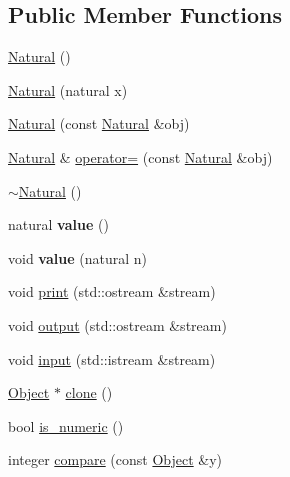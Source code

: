 \subsection*{Public Member Functions}
\begin{DoxyCompactItemize}
\item 
\hyperlink{classez_1_1objects_1_1Natural_a58ad55c4f02c9889291cafe5c5b26ec0}{Natural} ()
\item 
\hyperlink{classez_1_1objects_1_1Natural_a851dc0dec8710296e68c29f886b26bd9}{Natural} (natural x)
\item 
\hyperlink{classez_1_1objects_1_1Natural_a7f8e9004d3de3fac88d0341bc299a399}{Natural} (const \hyperlink{classez_1_1objects_1_1Natural}{Natural} \&obj)
\item 
\hyperlink{classez_1_1objects_1_1Natural}{Natural} \& \hyperlink{classez_1_1objects_1_1Natural_a271019dcdff99e4826b564759f16d3f2}{operator=} (const \hyperlink{classez_1_1objects_1_1Natural}{Natural} \&obj)
\item 
\hyperlink{classez_1_1objects_1_1Natural_a9ba22e1c5f4d7bdc13d426e03301c145}{$\sim$\+Natural} ()
\item 
\mbox{\label{classez_1_1objects_1_1Natural_a6c066338a20e2b519ad47c95cdbbd562}} 
natural {\bfseries value} ()
\item 
\mbox{\label{classez_1_1objects_1_1Natural_a4125a51d902d78e4c9e3f6f569435632}} 
void {\bfseries value} (natural n)
\item 
void \hyperlink{classez_1_1objects_1_1Natural_ac841a61814757882ad7f2282be3ceb1c}{print} (std\+::ostream \&stream)
\item 
void \hyperlink{classez_1_1objects_1_1Natural_a53b32330fc4911b138033b37b90bc467}{output} (std\+::ostream \&stream)
\item 
void \hyperlink{classez_1_1objects_1_1Natural_ae914aff21b276fbb1e73f48d426cbbc7}{input} (std\+::istream \&stream)
\item 
\hyperlink{classez_1_1objects_1_1Object}{Object} $\ast$ \hyperlink{classez_1_1objects_1_1Natural_a9f94e66e21ccc25b091cc87f4879af21}{clone} ()
\item 
bool \hyperlink{classez_1_1objects_1_1Natural_a0cb91a0c6b56b101bdf60e08df4d83f2}{is\+\_\+numeric} ()
\item 
integer \hyperlink{classez_1_1objects_1_1Natural_ad053e5ddc5242e8e94ce5f14ecc4dd13}{compare} (const \hyperlink{classez_1_1objects_1_1Object}{Object} \&y)

\end{DoxyCompactItemize}
